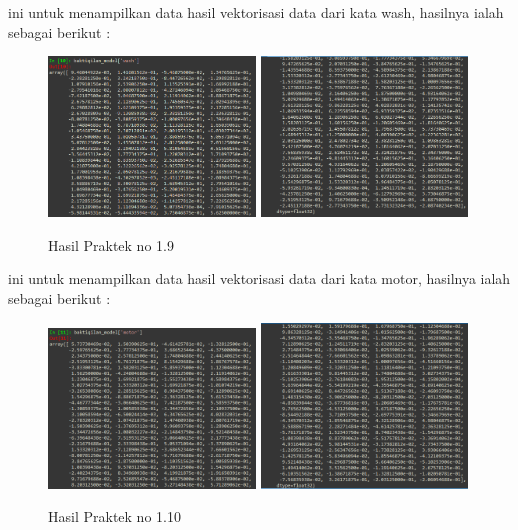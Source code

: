 
ini untuk menampilkan data hasil vektorisasi data dari kata wash, hasilnya ialah sebagai berikut :
\begin{figure}[H]
	\centering
	\includegraphics[width=5.5cm]{figures/1174083/figures5/24.png}
	\includegraphics[width=5.5cm]{figures/1174083/figures5/25.png}
	\caption{Hasil Praktek no 1.9}
\end{figure}


ini untuk menampilkan data hasil vektorisasi data dari kata motor, hasilnya ialah sebagai berikut :
\begin{figure}[H]
	\centering
	\includegraphics[width=5.5cm]{figures/1174083/figures5/26.png}
	\includegraphics[width=5.5cm]{figures/1174083/figures5/27.png}
	\caption{Hasil Praktek no 1.10}
\end{figure}

